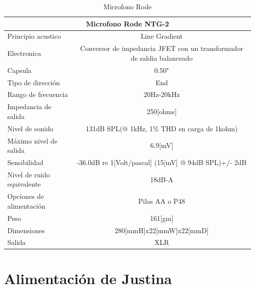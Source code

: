 \documentclass[a4paper,usenames,dvipsnames,svgnames,table]{book}
\begin{document}
\begin{minipage}{1\textwidth}
\begin{flushleft} %
\begin{table}[H]

\begin{tabular}{|l|l|}%

\hline
\multicolumn{2}{|c|}{Microfono Rode NTG-2} \\ \hline %
Principio acustico &  \multicolumn{1}{|c|}{Line Gradient}\\ \hline
Electronica & \multicolumn{1}{|c|}{Conversor de impedancia JFET con un transformador de saldia balanceado}\\ \hline
Capsula & \multicolumn{1}{|c|}{0.50"}\\ \hline
Tipo de dirección & \multicolumn{1}{|c|}{End}\\ \hline
Rango de frecuencia & \multicolumn{1}{|c|}{20Hz-20kHz}\\ \hline
Impedancia de salida & \multicolumn{1}{|c|}{250[ohms]}\\ \hline
Nivel de sonido & \multicolumn{1}{|c|}{131dB SPL(@ 1kHz, 1\% THD en carga de 1kohm)}\\ \hline
Máximo nivel de salida & \multicolumn{1}{|c|}{6.9[mV]}\\ \hline
Sensibilidad & \multicolumn{1}{|c|}{-36.0dB re 1[Volt/pascal] (15[mV] @ 94dB SPL)+/- 2dB}\\ \hline
Nivel de ruido equivalente & \multicolumn{1}{|c|}{18dB-A}\\ \hline
Opciones de alimentación & \multicolumn{1}{|c|}{Pilas AA o P48}\\ \hline
Peso & \multicolumn{1}{|c|}{161[gm]}\\ \hline
Dimensiones & \multicolumn{1}{|c|}{280[mmH]x22[mmW]x22[mmD]}\\ \hline
Salida & \multicolumn{1}{|c|}{XLR}\\ \hline


\end{tabular}
\caption{Microfono Rode}
\label{Microfono Rode}

\end{table}

\end{flushleft}
\end{minipage}
\vfill

\section{Alimentación de Justina}
\end{document}
